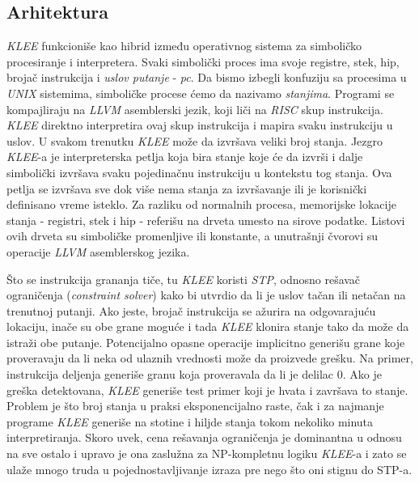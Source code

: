 \documentclass[a4paper]{article}
\begin{document}
\subsection{Arhitektura}
\label{subsec:podnaslov2}
\textit{KLEE} funkcioniše kao hibrid između operativnog sistema za simboličko procesiranje i interpretera. Svaki simbolički proces ima svoje registre, stek, hip, brojač instrukcija i \textit{uslov putanje} - \textit{pc}. Da bismo izbegli konfuziju sa procesima u \textit{UNIX} sistemima, simboličke procese ćemo da nazivamo \textit{stanjima}. Programi se kompajliraju na \textit{LLVM} asemblerski jezik, koji liči na \textit{RISC}  skup instrukcija. \textit{KLEE} direktno interpretira ovaj skup instrukcija i mapira svaku instrukciju u uslov. U svakom trenutku \textit{KLEE} može da izvršava veliki broj stanja. Jezgro \textit{KLEE}-a je interpreterska petlja koja bira stanje koje će da izvrši i dalje simbolički izvršava svaku pojedinačnu instrukciju u kontekstu tog stanja. Ova petlja se izvršava sve dok više nema stanja za izvršavanje ili je korisnički definisano vreme isteklo. Za razliku od normalnih procesa, memorijske lokacije stanja - registri, stek i hip -  referišu na drveta umesto na sirove podatke. Listovi ovih drveta su simboličke promenljive ili konstante, a unutrašnji čvorovi su operacije \textit{LLVM} asemblerskog jezika. 

Što se instrukcija grananja tiče, tu \textit{KLEE} koristi \textit{STP}, odnosno rešavač ograničenja (\textit{constraint solver}) kako bi utvrdio da li je uslov tačan ili netačan na trenutnoj putanji. Ako jeste, brojač instrukcija se ažurira na odgovarajuću lokaciju, inače su obe grane moguće i tada \textit{KLEE} klonira stanje tako da može da istraži obe putanje. Potencijalno opasne operacije implicitno generišu grane koje proveravaju da li neka od ulaznih vrednosti može da proizvede grešku. Na primer, instrukcija deljenja generiše granu koja proveravala da li je delilac 0. Ako je greška detektovana, \textit{KLEE} generiše test primer koji je hvata i završava to stanje. 
Problem je što broj stanja u praksi eksponencijalno raste, čak i za najmanje programe \textit{KLEE} generiše na stotine i hiljde stanja tokom nekoliko minuta interpretiranja. Skoro uvek, cena rešavanja ograničenja je dominantna u odnosu na sve ostalo i upravo je ona zaslužna za NP-kompletnu logiku \textit{KLEE}-a i zato se ulaže mnogo truda u pojednostavljivanje izraza pre nego što oni stignu do STP-a. \cite{klee}
\end{document}
